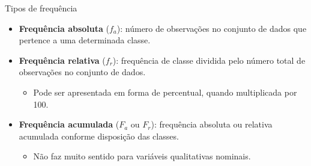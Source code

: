 \documentclass[
  ignorenonframetext,
  serif,
  professionalfont,
  usenames,
  dvipsnames,
  aspectratio = 169]{beamer}
\providecommand{\tightlist}{%
  \setlength{\itemsep}{0pt}\setlength{\parskip}{0pt}}
\renewcommand{\tightlist}{%
  \setlength{\itemsep}{0\baselineskip}
  \setlength{\parskip}{0.25\baselineskip}
}
\begin{document}
\begin{frame}{Tipos de frequência}
\label{tipos-de-frequuxeancia}
\begin{itemize}
\item
  \textbf{Frequência absoluta} (\(f_a\)): número de observações no
  conjunto de dados que pertence a uma determinada classe.
\item
  \textbf{Frequência relativa} (\(f_r\)): frequência de classe dividida
  pelo número total de observações no conjunto de dados.

  \begin{itemize}
  \tightlist
  \item
    Pode ser apresentada em forma de percentual, quando multiplicada por
    100.
  \end{itemize}
\item
  \textbf{Frequência acumulada} (\(F_a\) ou \(F_r\)): frequência
  absoluta ou relativa acumulada conforme disposição das classes.

  \begin{itemize}
  \tightlist
  \item
    Não faz muito sentido para variáveis qualitativas nominais.
  \end{itemize}
\end{itemize}
\end{frame}
\end{document}
